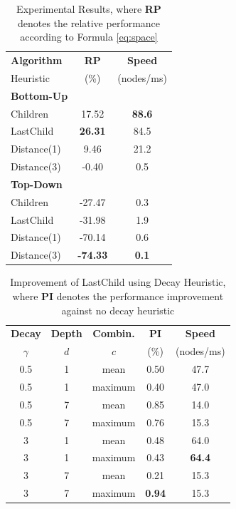 \begin{table}[h]
\centering
\caption{Experimental Results, where \textbf{RP} denotes the relative performance according to Formula \ref{eq:space}}
\label{tab:results}
\begin{tabular}{l c c}
\toprule
\textbf{Algorithm} & \textbf{RP} & \textbf{Speed}\\ 
Heuristic & (\%) & (nodes/ms)\\ 
\midrule

\textbf{Bottom-Up} & & \\
Children & 17.52 & \textbf{88.6} \\ 
LastChild & \textbf{26.31} & 84.5 \\ 
Distance(1) & 9.46 & 21.2 \\ 
Distance(3) & -0.40 & 0.5\\ 

\midrule

\textbf{Top-Down} & & \\
Children & -27.47 & 0.3 \\
LastChild & -31.98 & 1.9 \\
Distance(1) & -70.14 & 0.6 \\ 
Distance(3) & \textbf{-74.33} & \textbf{0.1}\\ 

\bottomrule
\end{tabular}
\end{table}

\begin{table}[t]
\centering

\caption{Improvement of LastChild using Decay Heuristic, where \textbf{PI} denotes the performance improvement against no decay heuristic}
\label{tab:decay}
\begin{tabular}{c c c c c}
\toprule
\textbf{Decay} & \textbf{Depth} &  \textbf{Combin.} & \textbf{PI} & \textbf{Speed}\\ 
$\gamma$ &$d$ &  $c$ &  (\%) & (nodes/ms)\\ 
\midrule
0.5&1& mean & 0.50 & 47.7\\ 
0.5& 1& maximum & 0.40 & 47.0 \\
0.5& 7& mean& 0.85 & 14.0 \\
0.5& 7& maximum & 0.76 & 15.3 \\
3&   1& mean & 0.48 & 64.0\\
3&   1& maximum & 0.43 & \textbf{64.4} \\
3&   7& mean & 0.21 & 15.3 \\ 
3&   7& maximum & \textbf{0.94} & 15.3 \\
\bottomrule
\end{tabular}
\end{table}

